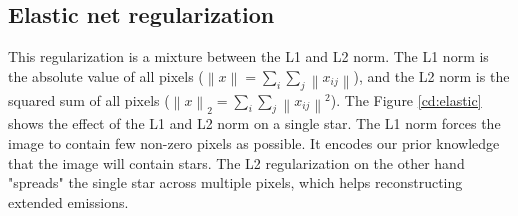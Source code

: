 \subsection{Elastic net regularization} \label{cd:reg}
This regularization is a mixture between the L1 and L2 norm. The L1 norm is the absolute value of all pixels ($\left \| x \right \| = \sum_i \sum_j \left \| x_{ij} \right \|$), and the L2 norm is the squared sum of all pixels ($\left \| x \right \|_2 = \sum_i \sum_j \left \| x_{ij} \right \|^2$). The Figure \ref{cd:elastic} shows the effect of the L1 and L2 norm on a single star. The L1 norm forces the image to contain few non-zero pixels as possible. It encodes our prior knowledge that the image will contain stars. The L2 regularization on the other hand "spreads" the single star across multiple pixels, which helps reconstructing extended emissions.

